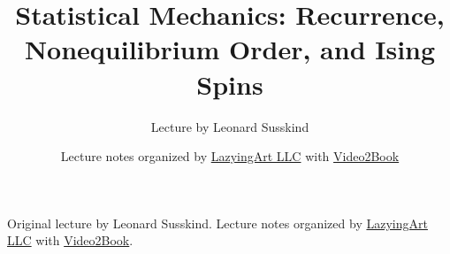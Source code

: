 \documentclass[11pt,oneside]{book}
\begin{document}
\frontmatter
\hypersetup{pageanchor=false}
\title{Statistical Mechanics: Recurrence, Nonequilibrium Order, and Ising Spins}
\author{Lecture by Leonard Susskind}
\date{Lecture notes organized by \href{https://lazying.art}{LazyingArt LLC} with \href{https://github.com/lachlanchen/Video2Book}{Video2Book}}
\maketitle
\begin{center}
\small Original lecture by Leonard Susskind. Lecture notes organized by \href{https://lazying.art}{LazyingArt LLC} with \href{https://github.com/lachlanchen/Video2Book}{Video2Book}.
\end{center}
\clearpage
\hypersetup{pageanchor=true}
\mainmatter

\end{document}
